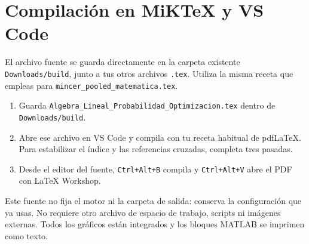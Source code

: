 \documentclass[11pt,a4paper]{article}
\theoremstyle{definition}
\begin{document}
\section{Compilación en MiKTeX y VS Code}
El archivo fuente se guarda directamente en la carpeta existente \texttt{Downloads/build}, junto a tus otros archivos \texttt{.tex}. Utiliza la misma receta que empleas para \texttt{mincer\_pooled\_matematica.tex}.
\begin{enumerate}
\item Guarda \texttt{Algebra\_Lineal\_Probabilidad\_Optimizacion.tex} dentro de \texttt{Downloads/build}.
\item Abre ese archivo en VS Code y compila con tu receta habitual de pdfLaTeX. Para estabilizar el índice y las referencias cruzadas, completa tres pasadas.
\item Desde el editor del fuente, \texttt{Ctrl+Alt+B} compila y \texttt{Ctrl+Alt+V} abre el PDF con LaTeX Workshop.
\end{enumerate}
Este fuente no fija el motor ni la carpeta de salida: conserva la configuración que ya usas. No requiere otro archivo de espacio de trabajo, scripts ni imágenes externas. Todos los gráficos están integrados y los bloques MATLAB se imprimen como texto.
\end{document}
